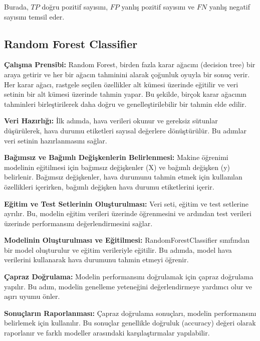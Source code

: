 \documentclass[twocolumn]{article}
\begin{document}
	Burada, \(TP\) doğru pozitif sayısını, \(FP\) yanlış pozitif sayısını ve \(FN\) yanlış negatif sayısını temsil eder.
	
	
	\begin{flushleft}
		\subsection{Random Forest Classifier}
		\begin{description}
			\item\textbf{Çalışma Prensibi:} Random Forest, birden fazla karar ağacını (decision tree) bir araya getirir ve her bir ağacın tahminini alarak çoğunluk oyuyla bir sonuç verir. Her karar ağacı, rastgele seçilen özellikler alt kümesi üzerinde eğitilir ve veri setinin bir alt kümesi üzerinde tahmin yapar. Bu şekilde, birçok karar ağacının tahminleri birleştirilerek daha doğru ve genelleştirilebilir bir tahmin elde edilir.
			
			\item\textbf{Veri Hazırlığı:} İlk adımda, hava verileri okunur ve gereksiz sütunlar düşürülerek, hava durumu etiketleri sayısal değerlere dönüştürülür. Bu adımlar veri setinin hazırlanmasını sağlar.
			
			\item\textbf{Bağımsız ve Bağımlı Değişkenlerin Belirlenmesi:} Makine öğrenimi modelinin eğitilmesi için bağımsız değişkenler (X) ve bağımlı değişken (y) belirlenir. Bağımsız değişkenler, hava durumunu tahmin etmek için kullanılan özellikleri içerirken, bağımlı değişken hava durumu etiketlerini içerir.
			
			\item\textbf{Eğitim ve Test Setlerinin Oluşturulması:} Veri seti, eğitim ve test setlerine ayrılır. Bu, modelin eğitim verileri üzerinde öğrenmesini ve ardından test verileri üzerinde performansını değerlendirmesini sağlar.
			
			\item\textbf{Modelinin Oluşturulması ve Eğitilmesi:} RandomForestClassifier sınıfından bir model oluşturulur ve eğitim verileriyle eğitilir. Bu adımda, model hava verilerini kullanarak hava durumunu tahmin etmeyi öğrenir.
			
			\item\textbf{Çapraz Doğrulama:} Modelin performansını doğrulamak için çapraz doğrulama yapılır. Bu adım, modelin genelleme yeteneğini değerlendirmeye yardımcı olur ve aşırı uyumu önler.
			
			\item\textbf{Sonuçların Raporlanması:} Çapraz doğrulama sonuçları, modelin performansını belirlemek için kullanılır. Bu sonuçlar genellikle doğruluk (accuracy) değeri olarak raporlanır ve farklı modeller arasındaki karşılaştırmalar yapılabilir.
		\end{description}
		

\end{flushleft}
\end{document}
